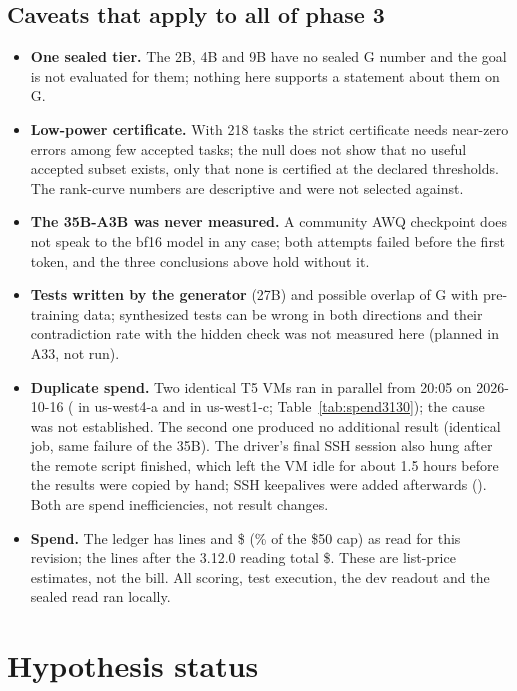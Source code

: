 \documentclass[11pt,a4paper]{article}
\newcommand{\code}[1]{\texttt{\detokenize{#1}}}
\begin{document}
\subsection{Caveats that apply to all of phase 3}\label{sec:p3-caveats}

\begin{itemize}
\item \textbf{One sealed tier.} The 2B, 4B and 9B have no sealed G number and the goal is not evaluated for them; nothing here supports a statement about them on G.
\item \textbf{Low-power certificate.} With 218 tasks the strict certificate needs near-zero errors among few accepted tasks; the null does not show that no useful accepted subset exists, only that none is certified at the declared thresholds. The rank-curve numbers are descriptive and were not selected against.
\item \textbf{The 35B-A3B was never measured.} A community AWQ checkpoint does not speak to the bf16 model in any case; both attempts failed before the first token, and the three conclusions above hold without it.
\item \textbf{Tests written by the generator} (27B) and possible overlap of G with pre-training data; synthesized tests can be wrong in both directions and their contradiction rate with the hidden check was not measured here (planned in A33, not run).
\item \textbf{Duplicate spend.} Two identical T5 VMs ran in parallel from 20:05 on 2026-10-16 (\code{p3-t5-200529} in us-west4-a and \code{p3-t5-200546} in us-west1-c; Table~\ref{tab:spend3130}); the cause was not established. The second one produced no additional result (identical job, same failure of the 35B). The driver's final SSH session also hung after the remote script finished, which left the VM idle for about 1.5 hours before the results were copied by hand; SSH keepalives were added afterwards (\code{805bfc5}). Both are spend inefficiencies, not result changes.
\item \textbf{Spend.} The ledger has \PThreeLines{} lines and \$\PThreeTotal{} (\PThreeShare\% of the \$50 cap) as read for this revision; the \PThreeNewLines{} lines after the 3.12.0 reading total \$\PThreeNewTotal{}. These are list-price estimates, not the bill. All scoring, test execution, the dev readout and the sealed read ran locally.
\end{itemize}

\section{Hypothesis status}\label{sec:verdicts}
\end{document}

